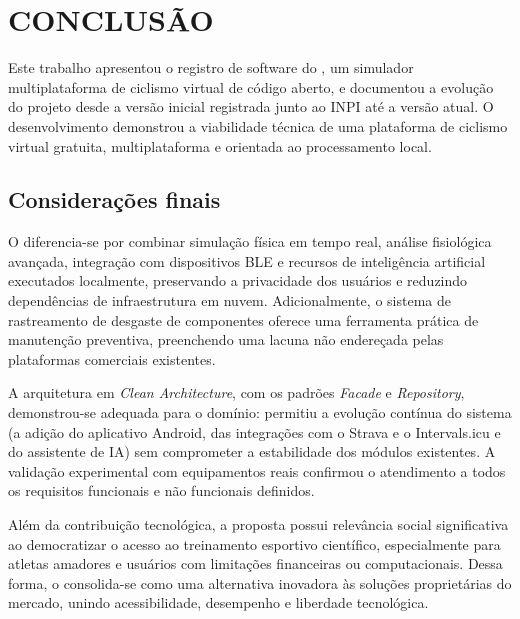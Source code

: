 
\chapter{CONCLUSÃO}
\label{cap:conclusao}

Este trabalho apresentou o registro de software do \argus{}, um simulador
multiplataforma de ciclismo virtual de código aberto, e documentou a evolução
do projeto desde a versão inicial registrada junto ao INPI até a versão atual.
O desenvolvimento demonstrou a viabilidade técnica de uma plataforma de
ciclismo virtual gratuita, multiplataforma e orientada ao processamento local.

\section{Considerações finais}
\label{sec:consideracoes-finais}

O \argus{} diferencia-se por combinar simulação física em tempo real, análise
fisiológica avançada, integração com dispositivos BLE e recursos de
inteligência artificial executados localmente, preservando a privacidade dos
usuários e reduzindo dependências de infraestrutura em nuvem. Adicionalmente, o
sistema de rastreamento de desgaste de componentes oferece uma ferramenta
prática de manutenção preventiva, preenchendo uma lacuna não endereçada pelas
plataformas comerciais existentes.

A arquitetura em \textit{Clean Architecture}, com os padrões \textit{Facade} e
\textit{Repository}, demonstrou-se adequada para o domínio: permitiu a evolução
contínua do sistema (a adição do aplicativo Android, das integrações
com o Strava e o Intervals.icu e do assistente de IA) sem comprometer a
estabilidade dos módulos existentes. A validação experimental com equipamentos
reais confirmou o atendimento a todos os requisitos funcionais e não
funcionais definidos.

Além da contribuição tecnológica, a proposta possui relevância social
significativa ao democratizar o acesso ao treinamento esportivo científico,
especialmente para atletas amadores e usuários com limitações financeiras ou
computacionais. Dessa forma, o \argus{} consolida-se como uma alternativa
inovadora às soluções proprietárias do mercado, unindo acessibilidade,
desempenho e liberdade tecnológica.

